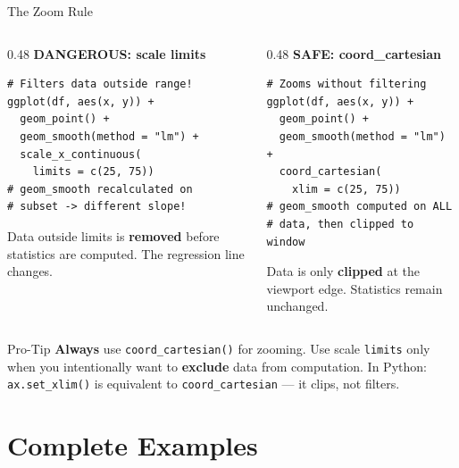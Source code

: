 \documentclass[10pt]{beamer}
\begin{document}
\begin{frame}[fragile]{The Zoom Rule}
  \begin{columns}[T]
    \begin{column}{0.48\textwidth}
      \textbf{DANGEROUS: scale limits}
\begin{lstlisting}[style=rstyle]
# Filters data outside range!
ggplot(df, aes(x, y)) +
  geom_point() +
  geom_smooth(method = "lm") +
  scale_x_continuous(
    limits = c(25, 75))
# geom_smooth recalculated on
# subset -> different slope!
\end{lstlisting}
      {\small Data outside limits is \textbf{removed}
      before statistics are computed. The regression
      line changes.}
    \end{column}
    \begin{column}{0.48\textwidth}
      \textbf{SAFE: coord\_cartesian}
\begin{lstlisting}[style=rstyle]
# Zooms without filtering
ggplot(df, aes(x, y)) +
  geom_point() +
  geom_smooth(method = "lm") +
  coord_cartesian(
    xlim = c(25, 75))
# geom_smooth computed on ALL
# data, then clipped to window
\end{lstlisting}
      {\small Data is only \textbf{clipped} at the
      viewport edge. Statistics remain unchanged.}
    \end{column}
  \end{columns}

  \vspace{6pt}
  \begin{alertblock}{Pro-Tip}
    \textbf{Always} use \texttt{coord\_cartesian()} for zooming. Use
    scale \texttt{limits} only when you intentionally want to
    \textbf{exclude} data from computation.
    In Python: \texttt{ax.set\_xlim()} is equivalent to
    \texttt{coord\_cartesian} --- it clips, not filters.
  \end{alertblock}
\end{frame}

\section{Complete Examples}
\end{document}
